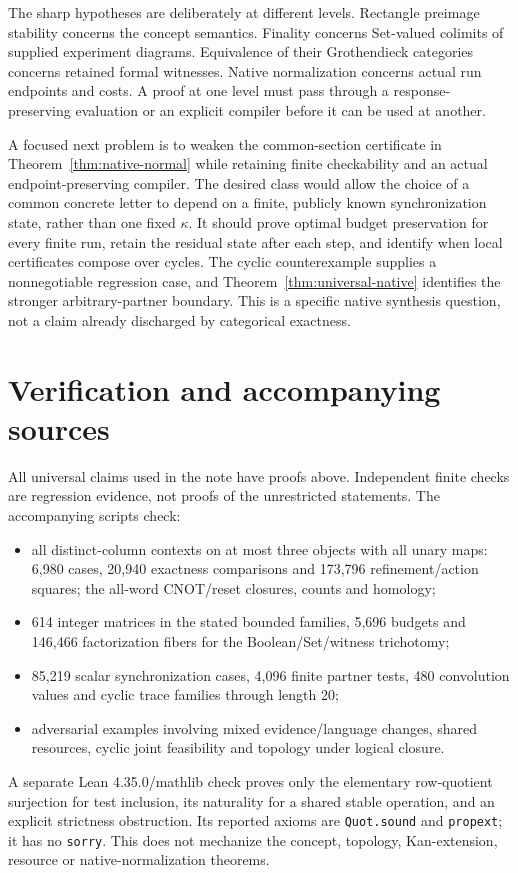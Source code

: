 \documentclass[11pt]{article}
\theoremstyle{definition}\newtheorem{definition}[theorem]{Definition}
\theoremstyle{remark}\newtheorem{remark}[theorem]{Remark}
\begin{document}
The sharp hypotheses are deliberately at different levels. Rectangle
preimage stability concerns the concept semantics. Finality concerns
Set-valued colimits of supplied experiment diagrams. Equivalence of their
Grothendieck categories concerns retained formal witnesses. Native
normalization concerns actual run endpoints and costs. A proof at one
level must pass through a response-preserving evaluation or an explicit
compiler before it can be used at another.

A focused next problem is to weaken the common-section certificate in
Theorem~\ref{thm:native-normal} while retaining finite checkability and an
actual endpoint-preserving compiler. The desired class would allow the
choice of a common concrete letter to depend on a finite, publicly known
synchronization state, rather than one fixed $\kappa$. It should prove
optimal budget preservation for every finite run, retain the residual
state after each step, and identify when local certificates compose over
cycles. The cyclic counterexample supplies a nonnegotiable regression
case, and Theorem~\ref{thm:universal-native} identifies the stronger
arbitrary-partner boundary. This is a specific native synthesis question,
not a claim already discharged by categorical exactness.

\section{Verification and accompanying sources}\label{sec:verification}
All universal claims used in the note have proofs above. Independent finite
checks are regression evidence, not proofs of the unrestricted statements.
The accompanying scripts check:
\begin{itemize}
\item all distinct-column contexts on at most three objects with all unary
maps: 6,980 cases, 20,940 exactness comparisons and 173,796 refinement/action
squares; the all-word CNOT/reset closures, counts and homology;
\item 614 integer matrices in the stated bounded families, 5,696 budgets
and 146,466 factorization fibers for the Boolean/Set/witness trichotomy;
\item 85,219 scalar synchronization cases, 4,096 finite partner tests,
480 convolution values and cyclic trace families through length 20;
\item adversarial examples involving mixed evidence/language changes,
shared resources, cyclic joint feasibility and topology under logical closure.
\end{itemize}
A separate Lean 4.35.0/mathlib check proves only the elementary
row-quotient surjection for test inclusion, its naturality for a shared
stable operation, and an explicit strictness obstruction. Its reported
axioms are \texttt{Quot.sound} and \texttt{propext}; it has no
\texttt{sorry}. This does not mechanize the concept, topology,
Kan-extension, resource or native-normalization theorems.
\end{document}
